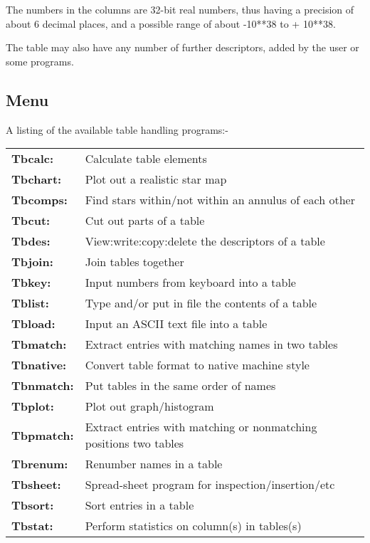 The numbers in the columns are 32-bit real numbers, thus having a
precision of about 6 decimal places, and a possible range of about
-10**38 to + 10**38.

The table may also have any number of further descriptors, added by the
user or some programs.

\subsection{Menu}

A listing of the available table handling programs:-

\begin{tabular}{ll} 
{\bf  Tbcalc:} &         
Calculate table elements \\ 
{\bf  Tbchart:} &        
Plot out a realistic star map \\ 
{\bf Tbcomps:} &        
Find stars within/not within an annulus of each other \\ 
{\bf  Tbcut:} &          
Cut out parts of a table \\ 
{\bf Tbdes:} &          
View:write:copy:delete the descriptors of a table \\
{\bf  Tbjoin:} &         
Join tables together \\ 
{\bf  Tbkey:} &          
Input numbers from keyboard into a table \\ 
{\bf  Tblist:} &         
Type and/or put in file the contents of a table \\ 
{\bf Tbload:} &         
Input an ASCII text file into a table \\ 
{\bf Tbmatch:} &        
Extract entries with matching names in two tables \\
{\bf  Tbnative:} &       
Convert table format to native machine style \\ 
{\bf  Tbnmatch:} &       
Put tables in the same order of names \\
{\bf  Tbplot:} &         
Plot out graph/histogram \\ 
{\bf  Tbpmatch:} &       
Extract entries with matching or nonmatching positions two tables  \\
{\bf  Tbrenum:} &        
Renumber names in a table \\ 
{\bf  Tbsheet:} &        
Spread-sheet program for inspection/insertion/etc \\ 
{\bf Tbsort:} &         Sort entries in a table \\ 
{\bf  Tbstat:} &
Perform statistics on column(s) in tables(s) \\ 

\end{tabular}
